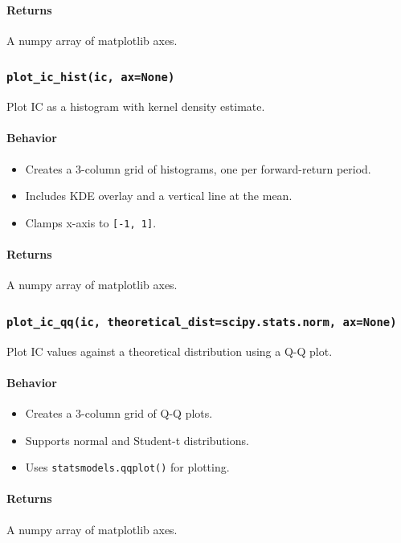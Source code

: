\documentclass[11pt]{article}
\begin{document}
\paragraph{Returns}
A numpy array of matplotlib axes.

\subsubsection{\texttt{plot\_ic\_hist(ic, ax=None)}}
Plot IC as a histogram with kernel density estimate.

\paragraph{Behavior}
\begin{itemize}
  \item Creates a 3-column grid of histograms, one per forward-return period.
  \item Includes KDE overlay and a vertical line at the mean.
  \item Clamps x-axis to \texttt{[-1, 1]}.
\end{itemize}

\paragraph{Returns}
A numpy array of matplotlib axes.

\subsubsection{\texttt{plot\_ic\_qq(ic, theoretical\_dist=scipy.stats.norm, ax=None)}}
Plot IC values against a theoretical distribution using a Q-Q plot.

\paragraph{Behavior}
\begin{itemize}
  \item Creates a 3-column grid of Q-Q plots.
  \item Supports normal and Student-t distributions.
  \item Uses \texttt{statsmodels.qqplot()} for plotting.
\end{itemize}

\paragraph{Returns}
A numpy array of matplotlib axes.
\end{document}
